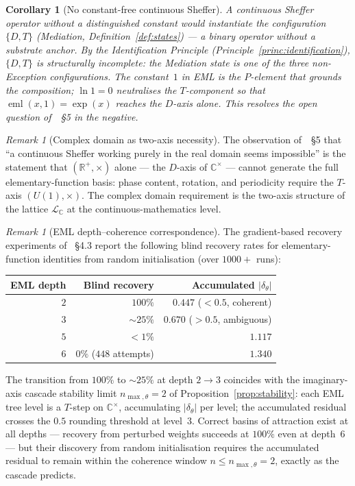 \documentclass[11pt,a4paper]{article}
\newtheorem{corollary}[theorem]{Corollary}
\theoremstyle{definition}
\theoremstyle{remark}
\newtheorem{remark}[theorem]{Remark}
\newcommand{\R}{\mathbb{R}}
\newcommand{\C}{\mathbb{C}}
\begin{document}
\begin{corollary}[No constant-free continuous Sheffer]\label{cor:no-constantfree}
A continuous Sheffer operator without a distinguished constant would instantiate the configuration $\{D,T\}$ (Mediation, Definition~\ref{def:states}) --- a binary operator without a substrate anchor. By the Identification Principle (Principle~\ref{princ:identification}), $\{D,T\}$ is structurally incomplete: the Mediation state is one of the three non-Exception configurations. The constant~$1$ in EML is the $P$-element that grounds the composition; $\ln 1 = 0$ neutralises the $T$-component so that $\operatorname{eml}(x,1) = \exp(x)$ reaches the $D$-axis alone. This resolves the open question of~\cite{Odrzywolek2026}~\S5 in the negative.
\end{corollary}

\begin{remark}[Complex domain as two-axis necessity]\label{rem:complex-domain}
The observation of~\cite{Odrzywolek2026}~\S5 that ``a continuous Sheffer working purely in the real domain seems impossible'' is the statement that $(\R^{+},\times)$ alone --- the $D$-axis of $\C^{\times}$ --- cannot generate the full elementary-function basis: phase content, rotation, and periodicity require the $T$-axis $(U(1),\times)$. The complex domain requirement is the two-axis structure of the lattice $\mathcal{L}_{\C}$ at the continuous-mathematics level.
\end{remark}

\begin{remark}[EML depth--coherence correspondence]\label{rem:eml-depth}
The gradient-based recovery experiments of~\cite{Odrzywolek2026} \S4.3 report the following blind recovery rates for elementary-function identities from random initialisation (over $1000+$ runs):
\begin{center}
\begin{tabular}{@{}r r r@{}}
\toprule
EML depth & Blind recovery & Accumulated $|\delta_{\theta}|$\\
\midrule
$2$ & $100\%$ & $0.447$ ($< 0.5$, coherent)\\
$3$ & $\sim 25\%$ & $0.670$ ($> 0.5$, ambiguous)\\
$5$ & $<1\%$ & $1.117$\\
$6$ & $0\%$ ($448$ attempts) & $1.340$\\
\bottomrule
\end{tabular}
\end{center}
The transition from $100\%$ to $\sim 25\%$ at depth $2 \to 3$ coincides with the imaginary-axis cascade stability limit $n_{\max,\theta}=2$ of Proposition~\ref{prop:stability}: each EML tree level is a $T$-step on $\C^{\times}$, accumulating $|\delta_{\theta}|$ per level; the accumulated residual crosses the $0.5$ rounding threshold at level~$3$. Correct basins of attraction exist at all depths --- recovery from perturbed weights succeeds at $100\%$ even at depth~$6$ --- but their discovery from random initialisation requires the accumulated residual to remain within the coherence window $n \le n_{\max,\theta}=2$, exactly as the cascade predicts.
\end{remark}
\end{document}
